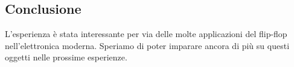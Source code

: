 \subsection{Conclusione}

L'esperienza è stata interessante per via delle molte applicazioni del flip-flop
nell'elettronica moderna. Speriamo di poter imparare ancora di più su
questi oggetti nelle prossime esperienze.
